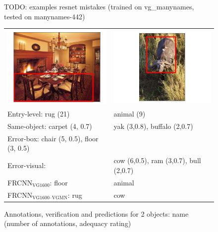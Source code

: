 \begin{figure}
	\caption{TODO: examples resnet mistakes (trained on vg\_manynames, tested on manynames-442)\label{fig:mistakes} }
\end{figure}

\begin{figure}
	\centering
	\footnotesize
	\begin{tabular}{p{3.7cm}p{3.7cm}}
	\includegraphics[scale=.2]{images/556_1063956_seed_ambiguous.png} &
	\includegraphics[scale=.2]{images/2657_1069343_singleton_obj.png} 
	\\
	Entry-level: rug (21) &  animal (9)\\
	\midrule
	Same-object: carpet (4, 0.7) &  yak (3,0.8), buffalo (2,0.7) \\
	Error-box: chair (5, 0.5), floor (3, 0.5) & \\
	Error-visual:  & cow (6,0.5), ram (3,0.7), bull (2,0.7)\\
	\midrule
	FRCNN$_{\text{VG1600}}$: floor & animal\\
	FRCNN$_{\text{VG1600--VGMN}}$: rug & cow \\
	\end{tabular}
	\caption{Annotations, verification and predictions for 2 objects: name (number of annotations, adequacy rating)}
\end{figure}

